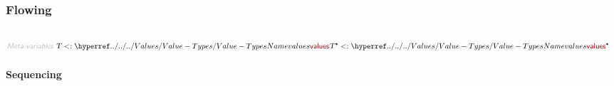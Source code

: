 \subsubsection*{Flowing}\hypertarget{flowing}{}\label{flowing}

\begin{align*}
  [ ~ 
  \KEY{Funcon} ~ & \NAMEREF{left-to-right} \\
  \KEY{Alias} ~ & \NAMEREF{l-to-r} \\
  \KEY{Funcon} ~ & \NAMEREF{right-to-left} \\
  \KEY{Alias} ~ & \NAMEREF{r-to-l} \\
  \KEY{Funcon} ~ & \NAMEREF{sequential} \\
  \KEY{Alias} ~ & \NAMEREF{seq} \\
  \KEY{Funcon} ~ & \NAMEREF{effect} \\
  \KEY{Funcon} ~ & \NAMEREF{choice} \\
  \KEY{Funcon} ~ & \NAMEREF{if-true-else} \\
  \KEY{Alias} ~ & \NAMEREF{if-else} \\
  \KEY{Funcon} ~ & \NAMEREF{while-true} \\
  \KEY{Alias} ~ & \NAMEREF{while} \\
  \KEY{Funcon} ~ & \NAMEREF{do-while-true} \\
  \KEY{Alias} ~ & \NAMEREF{do-while} \\
  \KEY{Funcon} ~ & \NAMEREF{interleave} \\
  \KEY{Datatype} ~ & \NAMEREF{yielding} \\
  \KEY{Funcon} ~ & \NAMEREF{signal} \\
  \KEY{Funcon} ~ & \NAMEREF{yielded} \\
  \KEY{Funcon} ~ & \NAMEREF{yield} \\
  \KEY{Funcon} ~ & \NAMEREF{yield-on-value} \\
  \KEY{Funcon} ~ & \NAMEREF{yield-on-abrupt} \\
  \KEY{Funcon} ~ & \NAMEREF{atomic}
  ~ ]
\end{align*}
\begin{align*}
  \KEY{Meta-variables} ~ 
  & \VAR{T} <: \NAMEHYPER{../../../Values}{Value-Types}{values} \VAR{T}\STAR <: \NAMEHYPER{../../../Values}{Value-Types}{values}\STAR
\end{align*}
\paragraph*{Sequencing}\hypertarget{sequencing}{}\label{sequencing}

